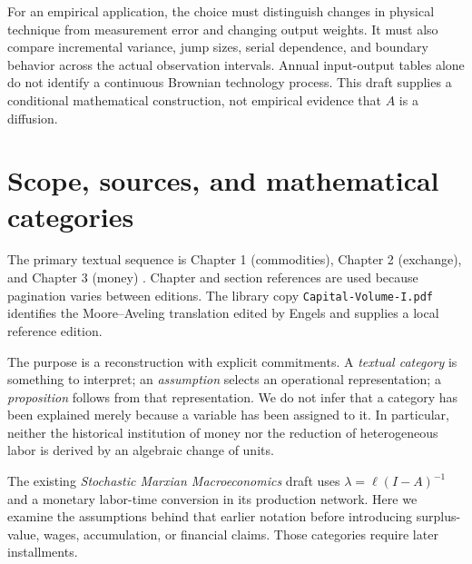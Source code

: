 \documentclass[11pt,letterpaper]{article}
\begin{document}
For an empirical application, the choice must distinguish changes in
physical technique from measurement error and changing output weights.
It must also compare incremental variance, jump sizes, serial dependence,
and boundary behavior across the actual observation intervals. Annual
input-output tables alone do not identify a continuous Brownian
technology process. This draft supplies a conditional mathematical
construction, not empirical evidence that $A$ is a diffusion.

\section{Scope, sources, and mathematical categories}
The primary textual sequence is Chapter 1 (commodities), Chapter 2
(exchange), and Chapter 3 (money) \cite{marx1,marx2,marx3}. Chapter and
section references are used because pagination varies between editions.
The library copy \texttt{Capital-Volume-I.pdf} identifies the Moore--Aveling
translation edited by Engels and supplies a local reference edition.

The purpose is a reconstruction with explicit commitments. A \emph{textual
category} is something to interpret; an \emph{assumption} selects an
operational representation; a \emph{proposition} follows from that
representation. We do not infer that a category has been explained merely
because a variable has been assigned to it. In particular, neither the
historical institution of money nor the reduction of heterogeneous labor
is derived by an algebraic change of units.

The existing \emph{Stochastic Marxian Macroeconomics} draft uses
$\lambda=\ell(I-A)^{-1}$ and a monetary labor-time conversion in its
production network. Here we examine the assumptions behind that earlier
notation before introducing surplus-value, wages, accumulation, or
financial claims. Those categories require later installments.
\end{document}
